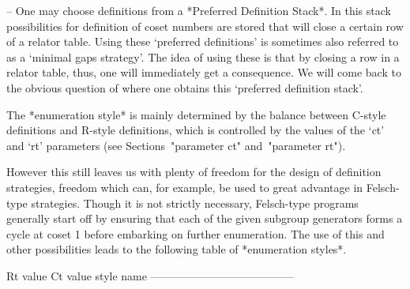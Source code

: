 \item{--}  One may  choose  definitions from  a *Preferred  Definition
Stack*.  In  this stack possibilities for definition  of coset numbers
are stored  that will close a  certain row of a  relator table.  Using
these \lq preferred definitions' is sometimes also  referred  to as  a
\lq minimal gaps strategy'. The idea of using these is that by closing
a  row  in  a  relator table, thus,   one   will  immediately   get  a
consequence.  We will come back to the obvious question of  where  one
obtains this \lq preferred definition stack'.

\endlist

The *enumeration  style* is mainly  determined by the  balance between
C-style definitions  and R-style  definitions, which is  controlled by
the values of the `ct' and `rt' parameters (see Sections~"parameter ct"
and~"parameter rt").

However this still leaves us with  plenty of freedom for the design of
definition  strategies,  freedom which  can, for example,  be  used to
great advantage in Felsch-type strategies. Though it is  not  strictly
necessary, Felsch-type  programs generally start off  by ensuring that
each of the given subgroup generators  forms a cycle at coset 1 before
embarking  on   further  enumeration.  The  use  of   this  and  other
possibilities leads to the following table of *enumeration styles*.


\begintt
Rt value     Ct value     style name
---------------------------------------


